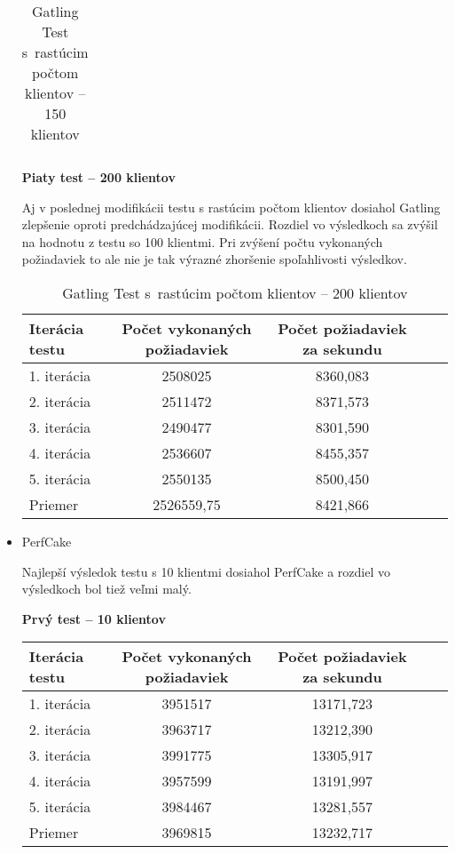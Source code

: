 \documentclass[12pt,oneside,final]{fithesis-utf8}
\begin{document}
\begin{itemize}
\begin{table}[H]
\begin{center}
\begin{tabular}{ | l | c | c | c | c |}
\end{tabular}
\end{center}
\caption{Gatling Test s~rastúcim počtom klientov -- 150 klientov}
\end{table}


\textbf{Piaty test -- 200 klientov}

Aj v poslednej modifikácii testu s rastúcim počtom klientov dosiahol Gatling zlepšenie oproti predchádzajúcej modifikácii. Rozdiel vo výsledkoch sa zvýšil na hodnotu z testu so 100 klientmi. Pri zvýšení počtu vykonaných požiadaviek to ale nie je tak výrazné zhoršenie spoľahlivosti výsledkov.

\begin{table}[H]
\begin{center}
\begin{tabular}{ | l | c | c | c | c |}
		\hline
		 \textbf{Iterácia testu} & \textbf{Počet vykonaných požiadaviek} & \textbf{Počet požiadaviek za sekundu} \\ \hline
		 1. iterácia & 2508025 & 8360,083 \\ \hline
		 2. iterácia & 2511472 & 8371,573 \\ \hline
		 3. iterácia & 2490477 & 8301,590 \\ \hline
		 4. iterácia & 2536607 & 8455,357 \\ \hline
		 5. iterácia & 2550135 & 8500,450 \\ \hline
		 Priemer & 2526559,75 & 8421,866 \\ \hline
		 
\end{tabular}
\end{center}
\caption{Gatling Test s~rastúcim počtom klientov -- 200 klientov}
\end{table}


\item PerfCake

Najlepší výsledok testu s 10 klientmi dosiahol PerfCake a rozdiel vo výsledkoch bol tiež veľmi malý.

\textbf{Prvý test -- 10 klientov}

\begin{table}[H]
\begin{center}
\begin{tabular}{ | l | c | c | c | c |}
		\hline
		 \textbf{Iterácia testu} & \textbf{Počet vykonaných požiadaviek} & \textbf{Počet požiadaviek za sekundu} \\ \hline
		 1. iterácia & 3951517 & 13171,723 \\ \hline
		 2. iterácia & 3963717 & 13212,390 \\ \hline
		 3. iterácia & 3991775 & 13305,917 \\ \hline
		 4. iterácia & 3957599 & 13191,997 \\ \hline
		 5. iterácia & 3984467 & 13281,557 \\ \hline
		 Priemer & 3969815 & 13232,717 \\ \hline
		 

\end{tabular}
\end{center}
\end{table}
\end{itemize}
\end{document}
